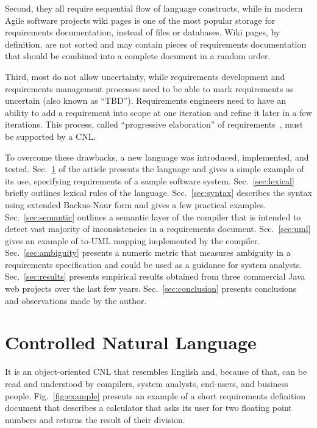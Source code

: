 \documentclass[sigplan,10pt,screen]{acmart}
\newcommand{\nospell}[1]{#1}
\begin{document}
Second, they all require sequential flow of language constructs, while in
modern Agile software projects wiki pages is one of the most popular storage for
requirements documentation, instead of files or databases. Wiki pages, by
definition, are not sorted and may contain pieces of requirements
documentation that should be combined into a complete document in a random
order.

Third, most do not allow uncertainty, while requirements development
and requirements management processes need to be able to mark
requirements as uncertain (also known as ``TBD''). Requirements engineers
need to have an ability to add a requirement into scope at one iteration
and refine it later in a few iterations. This process, called ``progressive
elaboration'' of requirements~\citep{pmbok4}, must be supported by a CNL.

To overcome these drawbacks, a new language was introduced,
implemented, and tested.
Sec.~\ref{sec:Requs} of
the article presents the language and gives a simple example of its use,
specifying requirements of a sample software system.
Sec.~\ref{sec:lexical} briefly outlines lexical rules of the language.
Sec.~\ref{sec:syntax} describes the syntax using extended \nospell{Backus-Naur}
form and gives a few practical examples.
Sec.~\ref{sec:semantic} outlines
a semantic layer of the compiler that is intended to detect vast majority
of inconsistencies in a requirements document.
Sec.~\ref{sec:uml} gives an example of to-UML mapping implemented
by the compiler.
Sec.~\ref{sec:ambiguity}
presents a numeric metric that measures ambiguity in a requirements
specification and could be used as a guidance for system analysts.
Sec.~\ref{sec:results} presents empirical results obtained from three
commercial Java web projects over the last few years.
Sec.~\ref{sec:conclusion} presents conclusions and observations made by
the author.

\section{Controlled Natural Language}
\label{sec:Requs}

It is an object-oriented CNL that resembles English and, because of that,
can be read and understood by compilers, system analysts, end-users, and
business people. Fig.~\ref{fig:example} presents an example of a short
requirements definition document that describes a calculator that asks its
user for two floating point numbers and returns the result of their
division.
\end{document}
